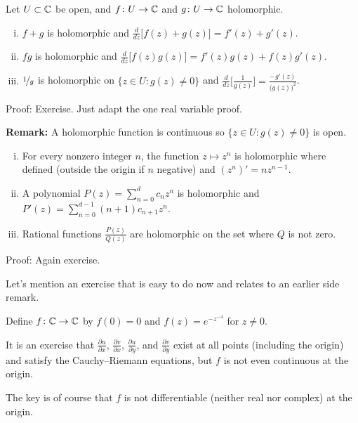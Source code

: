 \documentclass[10pt,aspectratio=169]{beamer}
\begin{document}
\begin{frame}
\begin{proposition}
Let $U \subset {\mathbb{C}}$ be open, and $f \colon U \to {\mathbb{C}}$ and
$g \colon U \to {\mathbb{C}}$ holomorphic.
\pause
\begin{enumerate}[(i)]
\item
$f+g$ is holomorphic and $\frac{d}{dz}\bigl[ f(z)+g(z) \bigr] = f'(z) + g'(z)$.
\pause
\item
$fg$ is holomorphic and $\frac{d}{dz}\bigl[f(z) g(z) \bigr] = f'(z)g(z) + f(z)g'(z)$.
\pause
\item
$\nicefrac{1}{g}$ is holomorphic on $\bigl\{ z \in U : g(z) \not= 0 \bigr\}$ and
$\frac{d}{dz}\bigl[\frac{1}{g(z)}\bigr] = \frac{-g'(z)}{{\bigl(g(z)\bigr)}^2}$.
\end{enumerate}
\end{proposition}

\medskip
\pause

Proof: Exercise.  Just adapt the one real variable proof.

\medskip
\pause

\textbf{Remark:} A holomorphic function is continuous so
$\bigl\{ z \in U : g(z) \not= 0 \bigr\}$ is open.
\end{frame}

\begin{frame}
\begin{proposition}
\begin{enumerate}[(i)]
\pause
\item For every nonzero integer $n$, the function $z \mapsto z^n$ is holomorphic
where defined (outside the origin if $n$ negative) and $(z^n)' = n z^{n-1}$.
\pause
\item
A polynomial $P(z) = \sum_{n=0}^d c_n z^n$ is
holomorphic and
$P'(z) = \sum_{n=0}^{d-1} (n+1) c_{n+1} z^n$.
\pause
\item Rational functions $\frac{P(z)}{Q(z)}$
are holomorphic on the set where $Q$ is not zero.
\end{enumerate}
\end{proposition}

\pause

Proof: Again exercise.
\end{frame}

\begin{frame}
Let's mention
an exercise that is easy to do now and relates to an earlier side remark.

\medskip
\pause

Define $f \colon {\mathbb{C}} \to {\mathbb{C}}$ by $f(0)=0$ and
$f(z) = e^{-z^{-4}}$ for $z \not=0$.

\medskip
\pause

It is an exercise that
$\frac{\partial u}{\partial x}$,
$\frac{\partial v}{\partial x}$,
$\frac{\partial u}{\partial y}$, and
$\frac{\partial v}{\partial y}$ exist at all points (including
the origin) and satisfy the Cauchy--Riemann equations,
but $f$ is not even continuous at the origin.

\medskip
\pause

The key is of course that $f$ is not differentiable (neither real nor complex)
at the origin.
\end{frame}
\end{document}
